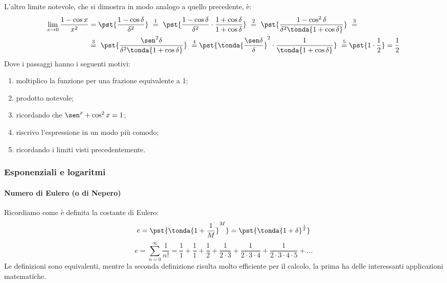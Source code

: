 L'altro limite notevole, che si dimostra in modo analogo a quello 
precedente, è:
\begin{align*}
 \lim_{x \rightarrow 0} \frac{1-\cos x}{x^2} &=
 \pst{\frac{1-\cos \delta}{\delta^2}}
~ \stackrel{1}{=} ~  
 \pst{\frac{1-\cos \delta}{\delta^2} \cdot 
      \frac{1+\cos \delta}{1+\cos \delta}}
~ \stackrel{2}{=} ~ 
 \pst{\frac{1-\cos^2 \delta}{\delta^2 \tonda{1+\cos \delta}}}~ 
\stackrel{3}{=} \\
& \stackrel{3}{=} ~
 \pst{\frac{\sen^2 \delta}{\delta^2 \tonda{1+\cos \delta}}}
~ \stackrel{4}{=}
 \pst{\tonda{\frac{\sen \delta}{\delta}}^2 \cdot 
      \frac{1}{\tonda{1+\cos \delta}}}
~ \stackrel{5}{=}
 \pst{1 \cdot \frac{1}{2}} = \frac{1}{2}
\end{align*}
Dove i passaggi hanno i seguenti motivi:
\begin{enumerate} [nosep]
 \item moltiplico la funzione per una frazione equivalente a 1;
 \item prodotto notevole;
 \item ricordando che \(\sen^x + \cos^2 x = 1\);
 \item riscrivo l'espressione in un modo più comodo;
 \item ricordando i limiti visti precedentemente.
\end{enumerate}

\subsubsection{Esponenziali e logaritmi}

\paragraph{Numero di Eulero (o di Nepero)}

Ricordiamo come è definita la costante di Eulero:
\[e = \pst{\tonda{1+\frac{1}{M}}^M} = 
\pst{\tonda{1+\delta}^\frac{1}{\delta}} 
\]
\[e=\sum_{n=0}^{\infty}{\frac{1}{n!}}=
\frac{1}{1}+\frac{1}{1}+\frac{1}{2}+\frac{1}{2\cdot3}+
\frac{1}{2\cdot3\cdot4}+\frac{1}{2\cdot3\cdot4\cdot5}+\dots\]
Le definizioni sono equivalenti, mentre la seconda definizione risulta 
molto efficiente per il calcolo, la 
prima ha delle interessanti applicazioni matematiche.


